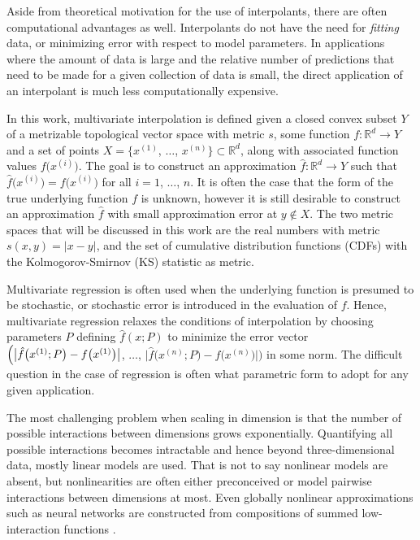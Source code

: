 \documentclass[smallextended,final]{svjour3}  %
\begin{document}
Aside from theoretical motivation for the use of interpolants, there
are often computational advantages as well. Interpolants do not have
the need for \textit{fitting} data, or minimizing error with respect
to model parameters. In applications where the amount of data is large
and the relative number of predictions that need to be made for a
given collection of data is small, the direct application of an
interpolant is much less computationally expensive.

In this work, multivariate interpolation is defined given a closed
convex subset $Y$ of a metrizable topological vector space with metric
$s$, some function $f:\mathbb{R}^d \rightarrow Y$ and a set of points
$X = \bigl\{x^{(1)}$, $\ldots$, $x^{(n)}\bigr\} \subset \mathbb{R}^d$,
along with associated function values $f\bigl(x^{(i)}\bigr)$. The goal
is to construct an approximation $\hat f: \mathbb{R}^d \rightarrow Y$
such that $\hat f\bigl(x^{(i)}\bigr) = f\bigl(x^{(i)}\bigr)$ for all
$i = 1$, $\ldots$, $n$. It is often the case that the form of the true
underlying function $f$ is unknown, however it is still desirable to
construct an approximation $\hat f$ with small approximation error at
$y \notin X$. The two metric spaces that will be discussed in this
work are the real numbers with metric $s(x,y) = |x-y|$, and the set of
cumulative distribution functions (CDFs) with the Kolmogorov-Smirnov
(KS) statistic as metric.

Multivariate regression is often used when the underlying function is
presumed to be stochastic, or stochastic error is introduced in the
evaluation of $f$. Hence, multivariate regression relaxes the
conditions of interpolation by choosing parameters $P$ defining $\hat
f(x;P)$ to minimize the error vector $\Bigl( \bigl | \hat f
\bigl(x^{(1)};P\bigr) - f\bigl(x^{(1)}\bigr) \bigr|$, $\ldots$, $\bigl
| \hat f \bigl(x^{(n)}; P\bigr) - f\bigl(x^{(n)}\bigr) \bigr | \Bigr)$
in some norm. The difficult question in the case of regression is
often what parametric form to adopt for any given application.

The most challenging problem when scaling in dimension is that the
number of possible interactions between dimensions grows
exponentially. Quantifying all possible interactions becomes
intractable and hence beyond three-dimensional data, mostly linear
models are used. That is not to say nonlinear models are absent, but
nonlinearities are often either preconceived or model pairwise
interactions between dimensions at most. Even globally nonlinear
approximations such as neural networks are constructed from
compositions of summed low-interaction functions
\cite{clevert2015fast}.
\end{document}
